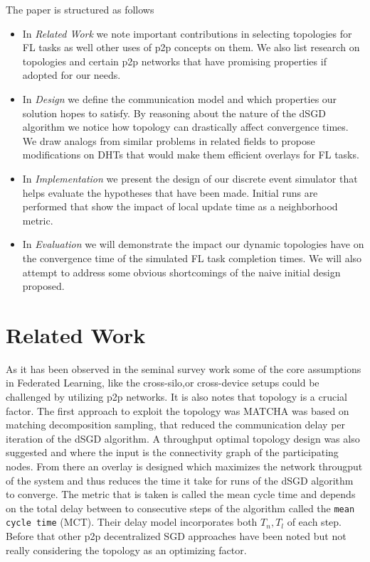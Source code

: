 \documentclass[12pt,notitlepage]{article}
\begin{document}
The paper is structured as follows
\begin{itemize}
\item In {\it Related Work} we note important contributions in selecting 
topologies for FL tasks as well other uses of p2p concepts on them.
We also list research on topologies and certain p2p networks that have 
promising properties if adopted for our needs.

\item In {\it Design} we define the communication model and which properties
our solution hopes to satisfy. By reasoning about the nature of the dSGD 
algorithm we notice how topology can drastically affect convergence times.
We draw analogs from similar problems in related fields to propose 
modifications on DHTs that would make them efficient overlays for FL tasks. 

\item In {\it Implementation} we present the design of our discrete event
simulator that helps evaluate the hypotheses that have been made. Initial
runs are performed that show the impact of local update time as a neighborhood
metric.

\item In {\it Evaluation} we will demonstrate the impact our dynamic topologies
have on the convergence time of the simulated FL task completion times. We 
will also  attempt to address some obvious shortcomings of the naive initial 
design proposed.

\end{itemize}

\section{Related Work}
As it has been observed in the seminal survey work \cite{fl-survey} some of 
the core assumptions in Federated Learning, like the cross-silo,or cross-device
setups could be challenged by utilizing p2p networks. It is also notes that
topology is a crucial factor. The first approach to exploit the topology was
MATCHA \cite{matcha} was based on matching decomposition sampling, that reduced
the communication delay per iteration of the dSGD algorithm. A throughput 
optimal topology design was also suggested \cite{marfoq2020throughputoptimal}
and where the input is the connectivity graph of the participating nodes.
From there an overlay is designed which maximizes the network througput of
the system and thus reduces the time it take for runs of the dSGD algorithm
to converge. The metric that is taken is called the mean cycle time
and depends on the total delay between to consecutive steps of the algorithm
called the {\tt mean cycle time} (MCT). Their delay model incorporates
both $T_n, T_l$ of each step. Before that other p2p decentralized SGD 
approaches have been noted \cite{personal-private} but not really considering
the topology as an optimizing factor.
\end{document}
